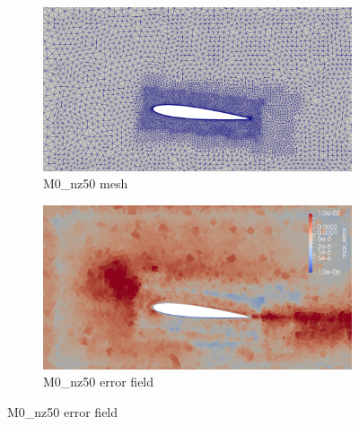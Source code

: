 \begin{figure}[H]
	\centering
	\begin{subfigure}[b]{0.475\textwidth}
		\centering
		\includegraphics[width=1\textwidth]{figures/zonal_adapt_results/Mesh_and_error_plots_Re200k/M0_inplane.png}
		\caption{M0\_nz50 mesh}
		\label{fig:zonal_M0_mesh_Re200k}
	\end{subfigure}
	\begin{subfigure}[b]{0.475\textwidth}
		\centering
		\includegraphics[width=1\textwidth]{figures/zonal_adapt_results/Mesh_and_error_plots_Re200k/M0_error.png}
		\caption{M0\_nz50 error field}
		\label{fig:zonal_M0_error_Re200k}
	\end{subfigure}
	

\end{figure}
